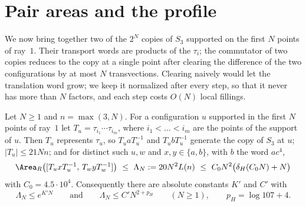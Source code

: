 \section{Pair areas and the profile}\label{sec:profile}

We now bring together two of the $2^N$ copies of $S_3$ supported on the first $N$ points of ray~$1$. Their transport words are products of the
$\tau_i$; the commutator of two copies reduces to the copy at a single point after clearing the difference of the two configurations by at most
$N$ transvections. Clearing naively would let the translation word grow; we keep it normalized after every step, so that it never has more than
$N$ factors, and each step costs $O(N)$ local fillings.

\begin{theorem}\label{thm:pair-area}
Let $N\ge1$ and $n=\max(3,N)$. For a configuration $u$ supported in the first $N$ points of ray~$1$ let $T_u=\tau_{i_1}\cdots\tau_{i_m}$,
where $i_1<\dots<i_m$ are the points of the support of $u$. Then $T_u$ represents $\tau_u$, so $T_uaT_u^{-1}$ and $T_ubT_u^{-1}$ generate the copy
of $S_3$ at $u$; $|T_u|\le21Nn$; and for distinct such $u,w$ and $x,y\in\{a,b\}$, with $b$ the word $ac^4$,
\[
\Area_R\bigl([T_uxT_u^{-1},\,T_wyT_w^{-1}]\bigr)\ \le\ \Lambda_N:=20N^2L(n)\ \le\ C_0N^2\bigl(\delta_H(C_0N)+N\bigr)
\]
with $C_0=4.5\cdot10^4$. Consequently there are absolute constants $K'$ and $C'$ with
\[
\Lambda_N\le e^{K'N}\qquad\text{and}\qquad \Lambda_N\le C'N^{2+p_H}\qquad(N\ge1),\qquad p_H=\log107+4 .
\]
\end{theorem}

